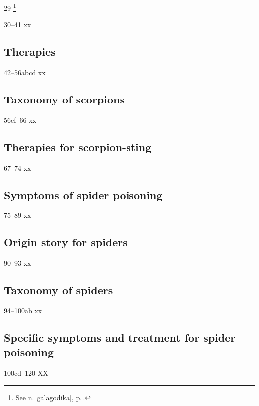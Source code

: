 \begin{translation}
\item [29] \footnote{See n.\,\ref{galagodika}, 
p.\,\pageref{galagodika}.}


\item[30--41] xx

\subsection{Therapies}

\item[42--56abcd] xx
 
\subsection{Taxonomy of scorpions}
 
 \item [56ef--66] xx
 
 \subsection{Therapies for scorpion-sting}
 
 \item[67--74] xx
 
 \subsection{Symptoms of spider poisoning}
 
 \item[75--89] xx
 
 \subsection{Origin story for spiders}
 
 \item[90--93] xx
 
 \subsection{Taxonomy of spiders}
 
 \item[94--100ab] xx
 
 \subsection{Specific symptoms and treatment for spider poisoning}
 
 \item[100cd--120] XX
 

\end{translation}
